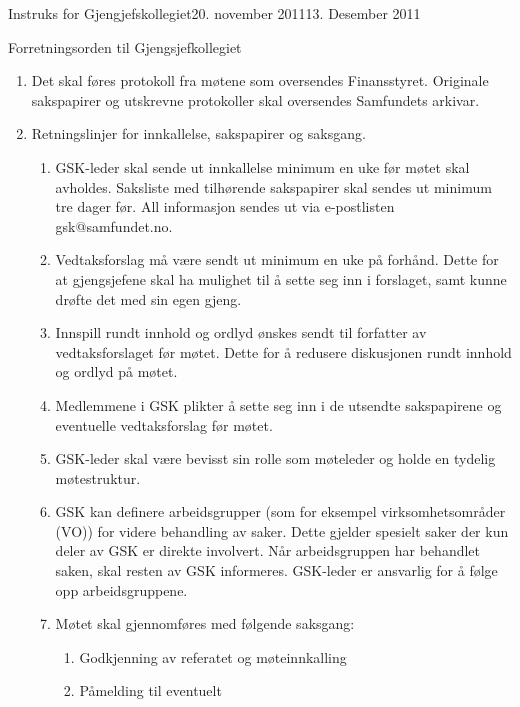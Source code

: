 \begin{instruks}{Instruks for Gjengjefskollegiet}{20. november 2011}{13. Desember 2011}
\begin{instruksledd}{Forretningsorden til Gjengsjefkollegiet}
\begin{enumerate}
            \item Det skal føres protokoll fra møtene som oversendes Finansstyret. Originale
                sakspapirer og utskrevne
                protokoller skal oversendes Samfundets arkivar.
            \item Retningslinjer for innkallelse, sakspapirer og saksgang.
                \begin{enumerate}
                    \item GSK-leder skal sende ut innkallelse minimum en uke før møtet skal
                        avholdes. Saksliste med tilhørende
                        sakspapirer skal sendes ut minimum tre dager før. All informasjon sendes
                        ut via e-postlisten gsk@samfundet.no.
                    \item Vedtaksforslag må være sendt ut minimum en uke på forhånd. Dette for at
                        gjengsjefene skal ha mulighet
                        til å sette seg inn i forslaget, samt kunne drøfte det med sin egen gjeng.
                    \item Innspill rundt innhold og ordlyd
                        ønskes sendt til forfatter av vedtaksforslaget før møtet. Dette for å
                        redusere diskusjonen rundt innhold og
                        ordlyd på møtet.
                    \item Medlemmene i GSK plikter å sette seg inn i de utsendte sakspapirene og
                        eventuelle vedtaksforslag før
                        møtet.
                    \item GSK-leder skal være bevisst sin rolle som møteleder og holde en tydelig
                        møtestruktur.
                    \item GSK kan definere arbeidsgrupper (som for eksempel virksomhetsområder (VO))
                        for videre behandling
                        av saker. Dette gjelder spesielt saker der kun deler av GSK er direkte
                        involvert. Når arbeidsgruppen har
                        behandlet saken, skal resten av GSK informeres. GSK-leder er ansvarlig for
                        å følge opp
                        arbeidsgruppene.
                    \item Møtet skal gjennomføres med følgende saksgang:
                        \begin{enumerate}
                            \item Godkjenning av referatet og møteinnkalling
                            \item Påmelding til eventuelt

\end{enumerate}
\end{enumerate}
\end{enumerate}
\end{instruksledd}
\end{instruks}
